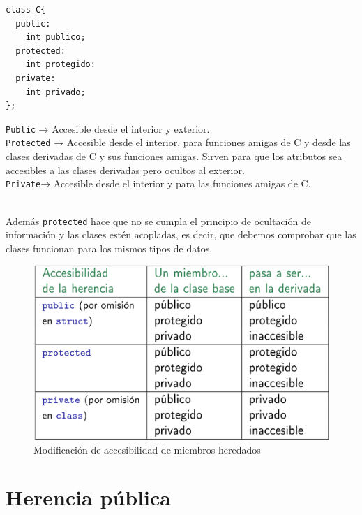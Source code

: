 \begin{minipage}[t]{0.3\textwidth}
	\begin{lstlisting}[frame=single]
class C{
  public:
    int publico;
  protected:
    int protegido:
  private:
    int privado;
};
	\end{lstlisting}
\end{minipage}
\hfill
\begin{minipage}[t]{0.6\textwidth}
	\texttt{Public} → Accesible desde el interior y exterior.\\
	
	\texttt{Protected} → Accesible desde el interior, para funciones amigas de C y desde las clases derivadas de C y sus funciones amigas. Sirven para que los atributos sea accesibles a las clases derivadas pero ocultos al exterior.\\
	
	\texttt{Private}→ Accesible desde el interior y para las funciones amigas de C.
\end{minipage}
\\

Además \texttt{protected} hace que no se cumpla el principio de ocultación de información y las clases estén acopladas, es decir, que debemos comprobar que las clases funcionan para los mismos tipos de datos.\\

\newpage
\begin{figure}[h]
	\centering
	\includegraphics[width=\textwidth]{Imagenes/gen4.png}
	\caption{Modificación de accesibilidad de miembros heredados}
\end{figure}
\vspace*{-1cm}

\left \section{Herencia pública}

